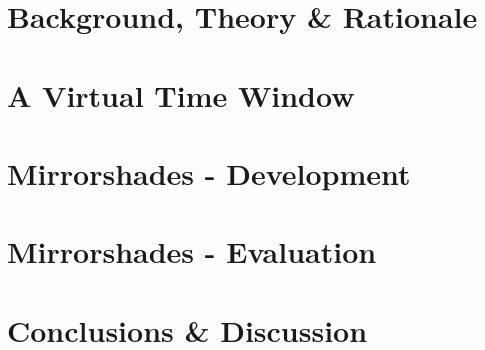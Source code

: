 \documentclass{report}
\begin{document}
\chapter{Background, Theory \& Rationale}
\graphicspath{ {03_background/images/} }

%


\chapter{A Virtual Time Window}
\graphicspath{ {04_vtw/images/} }



\chapter{Mirrorshades - Development}
\graphicspath{ {05_mirrorshades_design_implementation/images/} }



\chapter{Mirrorshades - Evaluation}
\graphicspath{ {06_mirrorshades_studies_results/images/} }



\chapter{Conclusions \& Discussion}





\begin{appendices}

%

\end{appendices}





\end{document}
